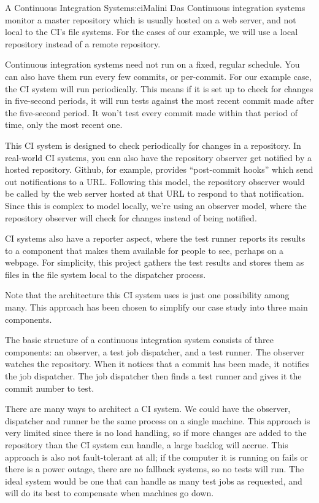 \begin{aosachapter}{A Continuous Integration System}{s:ci}{Malini Das}
Continuous integration systems monitor a master repository which is
usually hosted on a web server, and not local to the CI's file systems.
For the cases of our example, we will use a local repository instead of
a remote repository.

Continuous integration systems need not run on a fixed, regular
schedule. You can also have them run every few commits, or per-commit.
For our example case, the CI system will run periodically. This means if
it is set up to check for changes in five-second periods, it will run
tests against the most recent commit made after the five-second period.
It won't test every commit made within that period of time, only the
most recent one.

This CI system is designed to check periodically for changes in a
repository. In real-world CI systems, you can also have the repository
observer get notified by a hosted repository. Github, for example,
provides ``post-commit hooks'' which send out notifications to a URL.
Following this model, the repository observer would be called by the web
server hosted at that URL to respond to that notification. Since this is
complex to model locally, we're using an observer model, where the
repository observer will check for changes instead of being notified.

CI systems also have a reporter aspect, where the test runner reports
its results to a component that makes them available for people to see,
perhaps on a webpage. For simplicity, this project gathers the test
results and stores them as files in the file system local to the
dispatcher process.

Note that the architecture this CI system uses is just one possibility
among many. This approach has been chosen to simplify our case study
into three main components.

\label{introduction}

The basic structure of a continuous integration system consists of three
components: an observer, a test job dispatcher, and a test runner. The
observer watches the repository. When it notices that a commit has been
made, it notifies the job dispatcher. The job dispatcher then finds a
test runner and gives it the commit number to test.

There are many ways to architect a CI system. We could have the
observer, dispatcher and runner be the same process on a single machine.
This approach is very limited since there is no load handling, so if
more changes are added to the repository than the CI system can handle,
a large backlog will accrue. This approach is also not fault-tolerant at
all; if the computer it is running on fails or there is a power outage,
there are no fallback systems, so no tests will run. The ideal system
would be one that can handle as many test jobs as requested, and will do
its best to compensate when machines go down.


\end{aosachapter}
